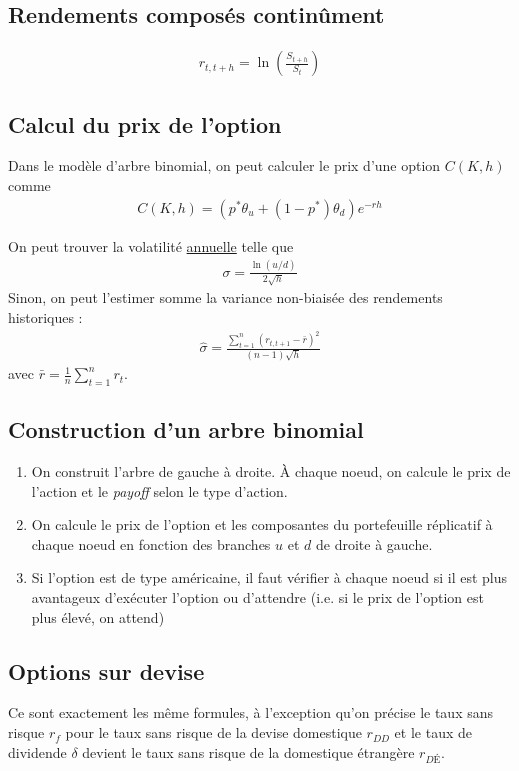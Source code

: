 \documentclass[10pt, french]{article}
\begin{document}
\begin{multicols*}{2}
\subsection*{Rendements composés continûment}
\begin{align*}
	r_{t,t+h} = \ln \left( \frac{S_{t+h}}{S_t} \right)
\end{align*}


\subsection*{Calcul du prix de l'option}
Dans le modèle d'arbre binomial, on peut calculer le prix d'une option $C(K,h)$ comme
\begin{align*}
	C(K,h) = (p^* \theta_u + (1-p^*)\theta_d) e^{-rh}
\end{align*}



On peut trouver la volatilité \underline{annuelle} telle que
\begin{align*}
	\sigma = \frac{\ln \left( u/d \right)}{2 \sqrt{h}}
\end{align*}
Sinon, on peut l'estimer somme la variance non-biaisée des rendements historiques :
\begin{align*}
	\hat{\sigma} = \frac{\sum_{t=1}^{n} (r_{t, t+1} - \bar{r})^2}{(n-1)\sqrt{h}}
\end{align*}
avec $\bar{r} = \frac{1}{n} \sum_{t=1}^n r_t$.

\subsection*{Construction d'un arbre binomial}
\begin{enumerate}
	\item On construit l'arbre de gauche à droite. À chaque noeud, on calcule le prix de l'action et le \emph{payoff} selon le type d'action.
	\item On calcule le prix de l'option et les composantes du portefeuille réplicatif à chaque noeud en fonction des branches $u$ et $d$ de droite à gauche.
	\item Si l'option est de type américaine, il faut vérifier à chaque noeud si il est plus avantageux d'exécuter l'option ou d'attendre (i.e. si le prix de l'option est plus élevé, on attend)
\end{enumerate}


\subsection*{Options sur devise}
Ce sont exactement les même formules, à l'exception qu'on précise le taux sans risque $r_f$ pour le taux sans risque de la devise domestique $r_{DD}$ et le taux de dividende $\delta$ devient le taux sans risque de la domestique étrangère $r_{DÉ}$.





\end{multicols*}
\end{document}
